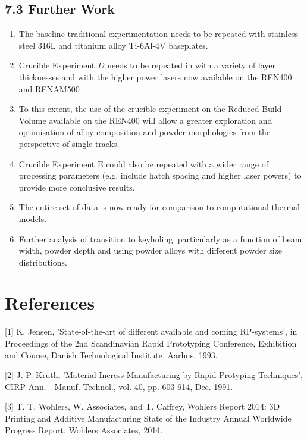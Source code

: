 \documentclass[10pt]{article}
\begin{document}
\subsection*{7.3 Further Work}
\begin{enumerate}
  \item The baseline traditional experimentation needs to be repeated with stainless steel 316L and titanium alloy Ti-6Al-4V baseplates.

  \item Crucible Experiment $D$ needs to be repeated in with a variety of layer thicknesses and with the higher power lasers now available on the REN400 and RENAM500

  \item To this extent, the use of the crucible experiment on the Reduced Build Volume available on the REN400 will allow a greater exploration and optimisation of alloy composition and powder morphologies from the perspective of single tracks.

  \item Crucible Experiment $\mathrm{E}$ could also be repeated with a wider range of processing parameters (e.g. include hatch spacing and higher laser powers) to provide more conclusive results.

  \item The entire set of data is now ready for comparison to computational thermal models.

  \item Further analysis of transition to keyholing, particularly as a function of beam width, powder depth and using powder alloys with different powder size distributions.

\end{enumerate}

\section*{References}
[1] K. Jensen, 'State-of-the-art of different available and coming RP-systems', in Proceedings of the 2nd Scandinavian Rapid Prototyping Conference, Exhibition and Course, Danish Technological Institute, Aarhus, 1993.

[2] J. P. Kruth, 'Material Incress Manufacturing by Rapid Protyping Techniques', CIRP Ann. - Manuf. Technol., vol. 40, pp. 603-614, Dec. 1991.

[3] T. T. Wohlers, W. Associates, and T. Caffrey, Wohlers Report 2014: 3D Printing and Additive Manufacturing State of the Industry Annual Worldwide Progress Report. Wohlers Associates, 2014.
\end{document}
